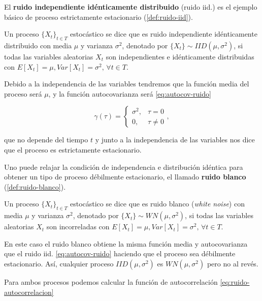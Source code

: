 El \textbf{ruido independiente idénticamente distribuido} (ruido iid.) es el ejemplo básico de proceso estrictamente estacionario (\autoref{def:ruido-iid}).

\begin{definicion}
  Un proceso $\{X_t\}_{t \in T}$ estocástico se dice que es ruido independiente idénticamente distribuido con media $\mu$ y varianza $\sigma^2$, denotado por $\{X_t\} \sim IID(\mu, \sigma^2)$, si todas las variables aleatorias $X_t$ son independientes e idénticamente distribuidas con $E[X_t] = \mu, Var[X_t] = \sigma^2, \, \forall t \in T$.
\label{def:ruido-iid}
\end{definicion}

Debido a la independencia de las variables tendremos que la función media del proceso será $\mu$, y la función autocovarianza será \eqref{eq:autocov-ruido}

\begin{equation}
  \gamma(\tau) =
  \begin{cases}
    \sigma^2, & \tau = 0 \\
    0, & \tau \neq 0
  \end{cases},
  \label{eq:autocov-ruido}
\end{equation}

que no depende del tiempo $t$ y junto a la independencia de las variables nos dice que el proceso es estrictamente estacionario.

Uno puede relajar la condición de independencia e distribución idéntica para obtener un tipo de proceso débilmente estacionario, el llamado \textbf{ruido blanco} (\autoref{def:ruido-blanco}).

\begin{definicion}
  Un proceso $\{X_t\}_{t \in T}$ estocástico se dice que es ruido blanco (\emph{white noise}) con media $\mu$ y varianza $\sigma^2$, denotado por $\{X_t\} \sim WN(\mu, \sigma^2)$, si todas las variables aleatorias $X_t$ son incorreladas con $E[X_t] = \mu, Var[X_t] = \sigma^2, \, \forall t \in T$.
\label{def:ruido-blanco}
\end{definicion}

En este caso el ruido blanco obtiene la misma función media y autocovarianza que el ruido iid. \eqref{eq:autocov-ruido} haciendo que el proceso sea débilmente estacionario. Así, cualquier proceso $IID(\mu, \sigma^2)$ es $WN(\mu, \sigma^2)$ pero no al revés.

Para ambos procesos podemos calcular la función de autocorrelación \eqref{eq:ruido-autocorrelacion}

